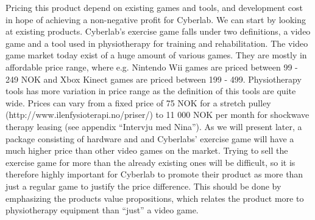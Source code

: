 Pricing this product depend on existing games and tools, and development cost in hope of achieving a non-negative profit for Cyberlab. We can start by looking at existing products. Cyberlab's exercise game falls under two definitions, a video game and a tool used in physiotherapy for training and rehabilitation. The video game market today exist of a huge amount of various games. They are mostly in affordable price range, where e.g. Nintendo Wii games are priced between 99 - 249 NOK and Xbox Kinect games are priced between 199 - 499. Physiotherapy tools has more variation in price range as the definition of this tools are quite wide. Prices can vary from a fixed price of 75 NOK for a stretch pulley (http://www.ilenfysioterapi.no/priser/)  to 11 000 NOK per month for shockwave therapy leasing (see appendix “Intervju med Nina”). As we will present later, a package consisting of hardware and and Cyberlabs’ exercise game will have a much higher price than other video games on the market. Trying to sell the exercise game for more than the already existing ones will be difficult, so it is therefore highly important for Cyberlab to promote their product as more than just a regular game to justify the price difference. This should be done by emphasizing the products value propositions, which relates the product more to physiotherapy equipment than “just” a video game. \\ \\
